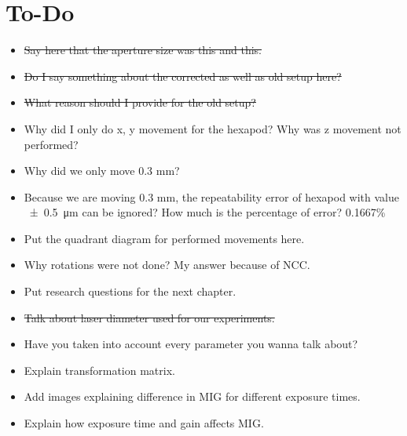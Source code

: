 \section*{To-Do}
\begin{itemize}
    \item \sout{Say here that the aperture size was this and this.}
    \item \sout{Do I say something about the corrected as well as old setup here?}
    \item \sout{What reason should I provide for the old setup?}
    \item Why did I only do x, y movement for the hexapod? Why was z movement not performed?
    \item Why did we only move 0.3 mm?
    \item Because we are moving 0.3 mm, the repeatability error of hexapod with value \SI{\pm0.5}{\micro\meter} can be ignored? How much is the percentage of error? 0.1667\%
    \item Put the quadrant diagram for performed movements here.
    \item Why rotations were not done? My answer because of NCC.
    \item Put research questions for the next chapter.
    \item \sout{Talk about laser diameter used for our experiments.}
    \item Have you taken into account every parameter you wanna talk about?
    \item Explain transformation matrix. 
    \item Add images explaining difference in MIG for different exposure times.
    \item Explain how exposure time and gain affects MIG.
\end{itemize}